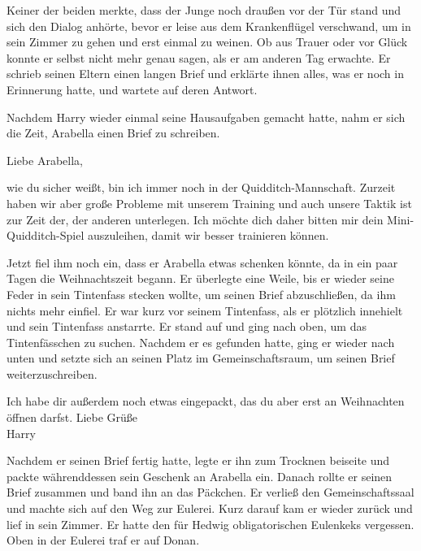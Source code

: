 Keiner der beiden merkte, dass der Junge noch draußen vor der Tür stand und sich den Dialog anhörte, bevor er leise aus dem Krankenflügel verschwand, um in sein Zimmer zu gehen und erst einmal zu weinen. Ob aus Trauer oder vor Glück konnte er selbst nicht mehr genau sagen, als er am anderen Tag erwachte. Er schrieb seinen Eltern einen langen Brief und erklärte ihnen alles, was er noch in Erinnerung hatte, und wartete auf deren Antwort.

\trenn

Nachdem Harry wieder einmal seine Hausaufgaben gemacht hatte, nahm er sich die Zeit, Arabella einen Brief zu schreiben.

\begin{brief}
Liebe Arabella,

wie du sicher weißt, bin ich immer noch in der Quidditch-Mannschaft. Zurzeit haben wir aber große Probleme mit unserem Training und auch unsere Taktik ist zur Zeit der, der anderen unterlegen. Ich möchte dich daher bitten mir dein Mini-Quidditch-Spiel auszuleihen, damit wir besser trainieren können.
\end{brief}

Jetzt fiel ihm noch ein, dass er Arabella etwas schenken könnte, da in ein paar Tagen die Weihnachtszeit begann. Er überlegte eine Weile, bis er wieder seine Feder in sein Tintenfass stecken wollte, um seinen Brief abzuschließen, da ihm nichts mehr einfiel. Er war kurz vor seinem Tintenfass, als er plötzlich innehielt und sein Tintenfass anstarrte.  Er stand auf und ging nach oben, um das Tintenfässchen zu suchen. Nachdem er es gefunden hatte, ging er wieder nach unten und setzte sich an seinen Platz im Gemeinschaftsraum, um seinen Brief weiterzuschreiben.

\begin{brief}
Ich habe dir außerdem noch etwas eingepackt, das du aber erst an Weihnachten öffnen darfst.
\signumspace
Liebe Grüße\\
Harry
\end{brief}

Nachdem er seinen Brief fertig hatte, legte er ihn zum Trocknen beiseite und packte währenddessen sein Geschenk an Arabella ein. Danach rollte er seinen Brief zusammen und band ihn an das Päckchen. Er verließ den Gemeinschaftssaal und machte sich auf den Weg zur Eulerei. Kurz darauf kam er wieder zurück und lief in sein Zimmer. Er hatte den für Hedwig obligatorischen Eulenkeks vergessen. Oben in der Eulerei traf er auf Donan.

